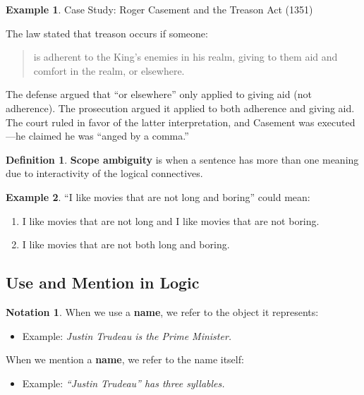 \documentclass{tufte-handout}
\theoremstyle{definition}
\newtheorem{defn}{Definition}
\theoremstyle{example}
\newtheorem{exmp}{Example}
\newtheorem{notn}{Notation}
\theoremstyle{remark}
\begin{document}
\begin{exmp}
  Case Study: Roger Casement and the Treason Act (1351)

  The law stated that treason occurs if someone:
  \begin{quote}
    is adherent to the King's enemies in his realm, giving to them aid and comfort in the realm, or elsewhere.
  \end{quote}
  The defense argued that ``or elsewhere'' only applied to giving aid (not adherence).
  The prosecution argued it applied to both adherence and giving aid.
  The court ruled in favor of the latter interpretation, and Casement was executed
  ---he claimed he was ``anged by a comma.''
\end{exmp}
\begin{defn}
  \textbf{Scope ambiguity} is when a sentence has more than one meaning due to interactivity of the logical connectives.
\end{defn}
\begin{exmp}
  ``I like movies that are not long and boring'' could mean:
  \begin{enumerate}[leftmargin=3\parindent]
    \item I like movies that are not long and I like movies that are not boring.
    \item I like movies that are not both long and boring.
  \end{enumerate}
\end{exmp}

\subsection{Use and Mention in Logic}
\begin{notn}
  When we use a \textbf{name}, we refer to the object it represents:
\begin{itemize}
    \item Example: \textit{Justin Trudeau is the Prime Minister.}
\end{itemize}
When we mention a \textbf{name}, we refer to the name itself:
\begin{itemize}
    \item Example: \textit{``Justin Trudeau'' has three syllables.}
\end{itemize}
\end{notn}
\end{document}
